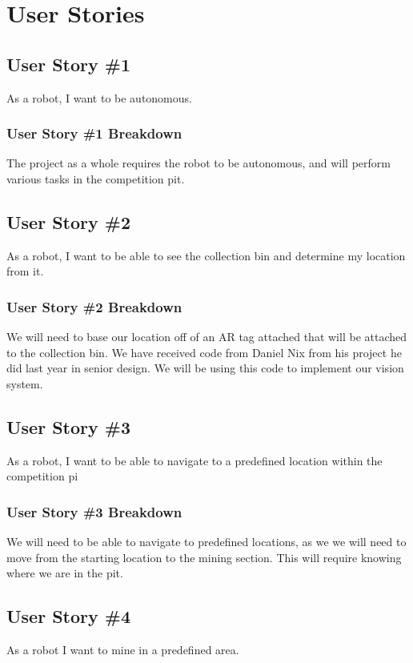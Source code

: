 \section{User Stories}


\subsection{User Story \#1}
As a robot, I want to be autonomous.

\subsubsection{User Story \#1 Breakdown}
The project as a whole requires the robot to be autonomous, and will perform various tasks in the competition pit.

\subsection{User Story \#2} 
As a robot, I want to be able to see the collection bin and determine my location from it.

\subsubsection{User Story \#2 Breakdown}
We will need to base our location off of an AR tag attached that will be attached to the collection bin. We have received code from Daniel Nix from his project he did last year in senior design. We will be using this code to implement our vision system.

\subsection{User Story \#3} 
As a robot, I want to be able to navigate to a predefined location within the competition pi
\subsubsection{User Story \#3 Breakdown}
We will need to be able to navigate to predefined locations, as we we will need to move from the starting location to the mining section. This will require knowing where we are in the pit.

\subsection{User Story \#4} 
As a robot I want to mine in a predefined area.
